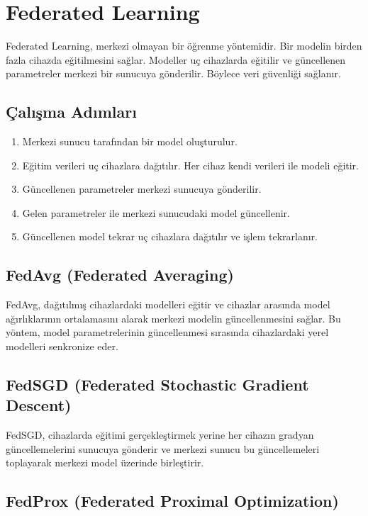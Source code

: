 \section{Federated Learning}
Federated Learning, merkezi olmayan bir öğrenme yöntemidir. Bir modelin birden fazla cihazda eğitilmesini sağlar. Modeller uç cihazlarda eğitilir ve güncellenen parametreler merkezi bir sunucuya gönderilir. Böylece veri güvenliği sağlanır.

\subsection{Çalışma Adımları}
\begin{enumerate}
    \item Merkezi sunucu tarafından bir model oluşturulur.
    \item Eğitim verileri uç cihazlara dağıtılır. Her cihaz kendi verileri ile modeli eğitir.
    \item Güncellenen parametreler merkezi sunucuya gönderilir.
    \item Gelen parametreler ile merkezi sunucudaki model güncellenir.
    \item Güncellenen model tekrar uç cihazlara dağıtılır ve işlem tekrarlanır. 
\end{enumerate}

\subsection{FedAvg (Federated Averaging)}

FedAvg, dağıtılmış cihazlardaki modelleri eğitir ve cihazlar arasında model ağırlıklarının ortalamasını alarak merkezi modelin güncellenmesini sağlar. Bu yöntem, model parametrelerinin güncellenmesi sırasında cihazlardaki yerel modelleri senkronize eder.

\subsection{FedSGD (Federated Stochastic Gradient Descent)}

FedSGD, cihazlarda eğitimi gerçekleştirmek yerine her cihazın gradyan güncellemelerini sunucuya gönderir ve merkezi sunucu bu güncellemeleri toplayarak merkezi model üzerinde birleştirir.

\subsection{FedProx (Federated Proximal Optimization)}

